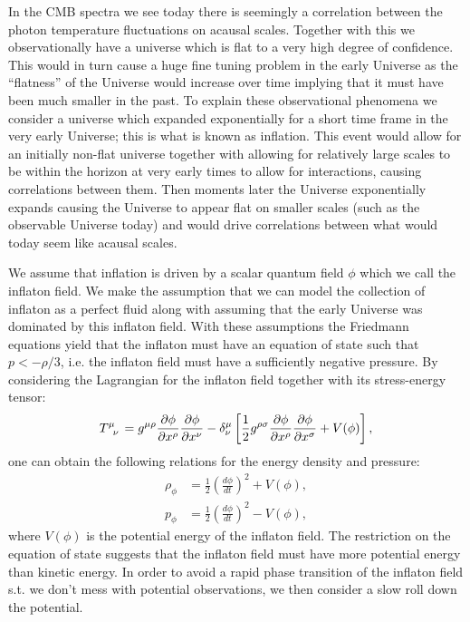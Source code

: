 \documentclass[%
reprint,
 amsmath,amssymb,
 aps,
]{revtex4-2}
\begin{document}
In the CMB spectra we see today there is seemingly a correlation between the photon temperature fluctuations on acausal scales. Together with this we observationally have a universe which is flat to a very high degree of confidence. This would in turn cause a huge fine tuning problem in the early Universe as the ``flatness'' of the Universe would increase over time implying that it must have been much smaller in the past. To explain these observational phenomena we consider a universe which expanded exponentially for a short time frame in the very early Universe; this is what is known as inflation. This event would allow for an initially non-flat universe together with allowing for relatively large scales to be within the horizon at very early times to allow for interactions, causing correlations between them. Then moments later the Universe exponentially expands causing the Universe to appear flat on smaller scales (such as the observable Universe today) and would drive correlations between what would today seem like acausal scales. 

We assume that inflation is driven by a scalar quantum field $\phi$ which we call the inflaton field. We make the assumption that we can model the collection of inflaton as a perfect fluid along with assuming that the early Universe was dominated by this inflaton field. With these assumptions the Friedmann equations yield that the inflaton must have an equation of state such that $p<-\rho/3$, i.e. the inflaton field must have a sufficiently negative pressure. By considering the Lagrangian for the inflaton field together with its stress-energy tensor: \cite{Dodelson:2003ft}
\[\tensor{T}{^\mu_\nu}=g^{\mu\rho}\pdv{\phi}{x^\rho}\pdv{\phi}{x^\nu}-\delta^\mu_\nu\left[\frac{1}{2}g^{\rho\sigma}\pdv{\phi}{x^\rho}\pdv{\phi}{x^\sigma}+V(\phi)\right],\]
one can obtain the following relations for the energy density and pressure:
\begin{align*}
	\rho_\phi&=\frac{1}{2}\left(\frac{d\phi}{dt}\right)^2+V(\phi),\\
	p_\phi&=\frac{1}{2}\left(\frac{d\phi}{dt}\right)^2-V(\phi),
\end{align*}
where $V(\phi)$ is the potential energy of the inflaton field. The restriction on the equation of state suggests that the inflaton field must have more potential energy than kinetic energy. In order to avoid a rapid phase transition of the inflaton field s.t. we don't mess with potential observations, we then consider a slow roll down the potential. 
\end{document}
